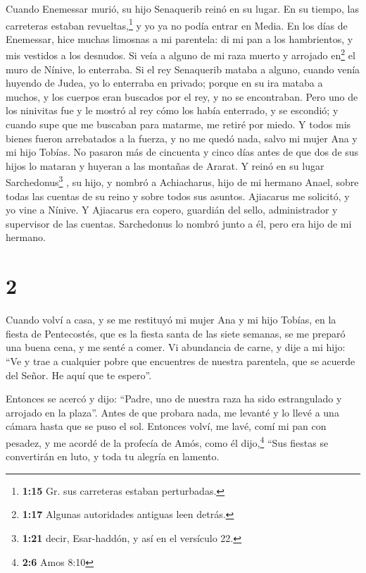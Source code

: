  Cuando Enemessar murió, su hijo Senaquerib reinó en su
lugar. En su tiempo, las carreteras estaban revueltas,\footnote{\textbf{1:15}
  Gr. sus carreteras estaban perturbadas.} y yo ya no podía entrar en
Media.  En los días de Enemessar, hice muchas limosnas a
mi parentela: di mi pan a los hambrientos,  y mis
vestidos a los desnudos. Si veía a alguno de mi raza muerto y arrojado
en\footnote{\textbf{1:17} Algunas autoridades antiguas leen detrás.} el
muro de Nínive, lo enterraba.  Si el rey Senaquerib
mataba a alguno, cuando venía huyendo de Judea, yo lo enterraba en
privado; porque en su ira mataba a muchos, y los cuerpos eran buscados
por el rey, y no se encontraban.  Pero uno de los
ninivitas fue y le mostró al rey cómo los había enterrado, y se
escondió; y cuando supe que me buscaban para matarme, me retiré por
miedo.  Y todos mis bienes fueron arrebatados a la
fuerza, y no me quedó nada, salvo mi mujer Ana y mi hijo Tobías.
 No pasaron más de cincuenta y cinco días antes de que
dos de sus hijos lo mataran y huyeran a las montañas de Ararat. Y reinó
en su lugar Sarchedonus\footnote{\textbf{1:21} decir, Esar-haddón, y así
  en el versículo 22.} , su hijo, y nombró a Achiacharus, hijo de mi
hermano Anael, sobre todas las cuentas de su reino y sobre todos sus
asuntos.  Ajiacarus me solicitó, y yo vine a Nínive. Y
Ajiacarus era copero, guardián del sello, administrador y supervisor de
las cuentas. Sarchedonus lo nombró junto a él, pero era hijo de mi
hermano.

\hypertarget{section-1}{%
\section{2}\label{section-1}}

 Cuando volví a casa, y se me restituyó mi mujer Ana y mi
hijo Tobías, en la fiesta de Pentecostés, que es la fiesta santa de las
siete semanas, se me preparó una buena cena, y me senté a comer.
 Vi abundancia de carne, y dije a mi hijo: ``Ve y trae a
cualquier pobre que encuentres de nuestra parentela, que se acuerde del
Señor. He aquí que te espero''.

 Entonces se acercó y dijo: ``Padre, uno de nuestra raza
ha sido estrangulado y arrojado en la plaza''.  Antes de
que probara nada, me levanté y lo llevé a una cámara hasta que se puso
el sol.  Entonces volví, me lavé, comí mi pan con pesadez,
 y me acordé de la profecía de Amós, como él
dijo,\footnote{\textbf{2:6} Amos 8:10} ``Sus fiestas se convertirán en
luto, y toda tu alegría en lamento.

